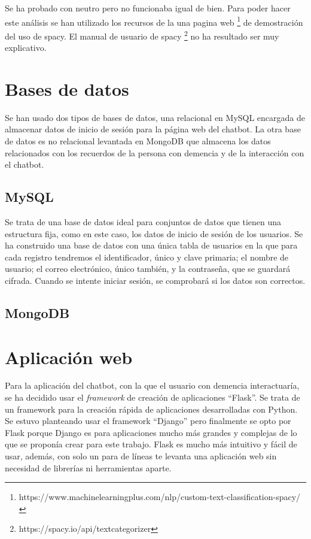 Se ha probado con neutro pero no funcionaba igual de bien. Para poder hacer este análisis se han utilizado los recursos de la una pagina web \footnote{https://www.machinelearningplus.com/nlp/custom-text-classification-spacy/} de demostración del uso de spacy. El manual de usuario de spacy \footnote{https://spacy.io/api/textcategorizer} no ha resultado ser muy explicativo.

\section{Bases de datos}

Se han usado dos tipos de bases de datos, una relacional en MySQL encargada de almacenar datos de inicio de sesión para la página web del chatbot. La otra base de datos es no relacional levantada en MongoDB que almacena los datos relacionados con los recuerdos de la persona con demencia y de la interacción con el chatbot. 

\subsection{MySQL}

Se trata de una base de datos ideal para conjuntos de datos que tienen una estructura fija, como en este caso, los datos de inicio de sesión de los usuarios. Se ha construido una base de datos con una única tabla de usuarios en la que para cada registro tendremos el identificador, único y clave primaria; el nombre de usuario; el correo electrónico, único también, y la contraseña, que se guardará cifrada. Cuando se intente iniciar sesión, se comprobará si los datos son correctos. 

\subsection{MongoDB}


\section{Aplicación web}

Para la aplicación del chatbot, con la que el usuario con demencia interactuaría, se ha decidido usar el \textit{framework} de creación de aplicaciones ``Flask''. Se trata de un framework para la creación rápida de aplicaciones desarrolladas con Python. Se estuvo planteando usar el framework ``Django'' pero finalmente se opto por Flask porque Django es para aplicaciones mucho más grandes y complejas de lo que se proponía crear para este trabajo. Flask es mucho más intuitivo y fácil de usar, además, con solo un para de líneas te levanta una aplicación web sin necesidad de librerías ni herramientas aparte. 
